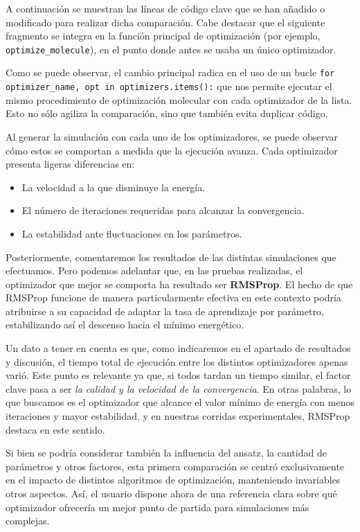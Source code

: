 A continuación se muestran las líneas de código clave que se han añadido o modificado para realizar dicha comparación. Cabe destacar que el siguiente fragmento se integra en la función principal de optimización (por ejemplo, \texttt{optimize\_molecule}), en el punto donde antes se usaba un único optimizador.

Como se puede observar, el cambio principal radica en el uso de un bucle \texttt{for optimizer\_name, opt in optimizers.items():} que nos permite ejecutar el mismo procedimiento de optimización molecular con cada optimizador de la lista. Esto no sólo agiliza la comparación, sino que también evita duplicar código.

Al generar la simulación con cada uno de los optimizadores, se puede observar cómo estos se comportan a medida que la ejecución avanza. Cada optimizador presenta ligeras diferencias en:
\begin{itemize}
    \item La velocidad a la que disminuye la energía.
    \item El número de iteraciones requeridas para alcanzar la convergencia.
    \item La estabilidad ante fluctuaciones en los parámetros.
\end{itemize}

Posteriormente, comentaremos los resultados de las distintas simulaciones que efectuamos. Pero podemos adelantar que, en las pruebas realizadas, el optimizador que mejor se comporta ha resultado ser \textbf{RMSProp}. El hecho de que RMSProp funcione de manera particularmente efectiva en este contexto podría atribuirse a su capacidad de adaptar la tasa de aprendizaje por parámetro, estabilizando así el descenso hacia el mínimo energético.

Un dato a tener en cuenta es que, como indicaremos en el apartado de resultados y discusión, el tiempo total de ejecución entre los distintos optimizadores apenas varió. Este punto es relevante ya que, si todos tardan un tiempo similar, el factor clave pasa a ser \textit{la calidad y la velocidad de la convergencia}. En otras palabras, lo que buscamos es el optimizador que alcance el valor mínimo de energía con menos iteraciones y mayor estabilidad, y en nuestras corridas experimentales, RMSProp destaca en este sentido.

Si bien se podría considerar también la influencia del ansatz, la cantidad de parámetros y otros factores, esta primera comparación se centró exclusivamente en el impacto de distintos algoritmos de optimización, manteniendo invariables otros aspectos. Así, el usuario dispone ahora de una referencia clara sobre qué optimizador ofrecería un mejor punto de partida para simulaciones más complejas.

